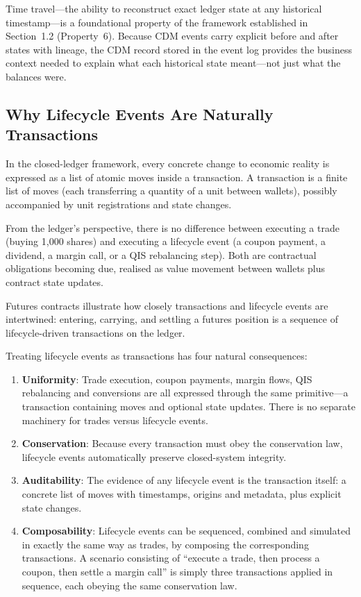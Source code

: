 \documentclass[11pt,a4paper]{article}
\begin{document}
Time travel---the ability to reconstruct exact ledger state at any historical timestamp---is a foundational property of the framework established in Section~1.2 (Property~6). Because CDM events carry explicit before and after states with lineage, the CDM record stored in the event log provides the business context needed to explain what each historical state meant---not just what the balances were.

\subsection{Why Lifecycle Events Are Naturally Transactions}

In the closed-ledger framework, every concrete change to economic reality is expressed as a list of atomic moves inside a transaction. A transaction is a finite list of moves (each transferring a quantity of a unit between wallets), possibly accompanied by unit registrations and state changes.

From the ledger's perspective, there is no difference between executing a trade (buying 1{,}000 shares) and executing a lifecycle event (a coupon payment, a dividend, a margin call, or a QIS rebalancing step). Both are contractual obligations becoming due, realised as value movement between wallets plus contract state updates.

Futures contracts illustrate how closely transactions and lifecycle events are intertwined: entering, carrying, and settling a futures position is a sequence of lifecycle-driven transactions on the ledger.

Treating lifecycle events as transactions has four natural consequences:

\begin{enumerate}
\item \textbf{Uniformity}: Trade execution, coupon payments, margin flows, QIS rebalancing and conversions are all expressed through the same primitive---a transaction containing moves and optional state updates. There is no separate machinery for trades versus lifecycle events.
\item \textbf{Conservation}: Because every transaction must obey the conservation law, lifecycle events automatically preserve closed-system integrity.
\item \textbf{Auditability}: The evidence of any lifecycle event is the transaction itself: a concrete list of moves with timestamps, origins and metadata, plus explicit state changes.
\item \textbf{Composability}: Lifecycle events can be sequenced, combined and simulated in exactly the same way as trades, by composing the corresponding transactions. A scenario consisting of ``execute a trade, then process a coupon, then settle a margin call'' is simply three transactions applied in sequence, each obeying the same conservation law.
\end{enumerate}
\end{document}
